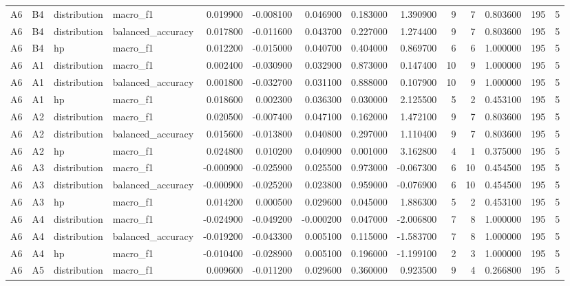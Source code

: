 \begin{table}
\begin{tabular}{llllrrrrrrrrrr}
A6 & B4 & distribution & macro\_f1 & 0.019900 & -0.008100 & 0.046900 & 0.183000 & 1.390900 & 9 & 7 & 0.803600 & 195 & 5 \\
A6 & B4 & distribution & balanced\_accuracy & 0.017800 & -0.011600 & 0.043700 & 0.227000 & 1.274400 & 9 & 7 & 0.803600 & 195 & 5 \\
A6 & B4 & hp & macro\_f1 & 0.012200 & -0.015000 & 0.040700 & 0.404000 & 0.869700 & 6 & 6 & 1.000000 & 195 & 5 \\
A6 & A1 & distribution & macro\_f1 & 0.002400 & -0.030900 & 0.032900 & 0.873000 & 0.147400 & 10 & 9 & 1.000000 & 195 & 5 \\
A6 & A1 & distribution & balanced\_accuracy & 0.001800 & -0.032700 & 0.031100 & 0.888000 & 0.107900 & 10 & 9 & 1.000000 & 195 & 5 \\
A6 & A1 & hp & macro\_f1 & 0.018600 & 0.002300 & 0.036300 & 0.030000 & 2.125500 & 5 & 2 & 0.453100 & 195 & 5 \\
A6 & A2 & distribution & macro\_f1 & 0.020500 & -0.007400 & 0.047100 & 0.162000 & 1.472100 & 9 & 7 & 0.803600 & 195 & 5 \\
A6 & A2 & distribution & balanced\_accuracy & 0.015600 & -0.013800 & 0.040800 & 0.297000 & 1.110400 & 9 & 7 & 0.803600 & 195 & 5 \\
A6 & A2 & hp & macro\_f1 & 0.024800 & 0.010200 & 0.040900 & 0.001000 & 3.162800 & 4 & 1 & 0.375000 & 195 & 5 \\
A6 & A3 & distribution & macro\_f1 & -0.000900 & -0.025900 & 0.025500 & 0.973000 & -0.067300 & 6 & 10 & 0.454500 & 195 & 5 \\
A6 & A3 & distribution & balanced\_accuracy & -0.000900 & -0.025200 & 0.023800 & 0.959000 & -0.076900 & 6 & 10 & 0.454500 & 195 & 5 \\
A6 & A3 & hp & macro\_f1 & 0.014200 & 0.000500 & 0.029600 & 0.045000 & 1.886300 & 5 & 2 & 0.453100 & 195 & 5 \\
A6 & A4 & distribution & macro\_f1 & -0.024900 & -0.049200 & -0.000200 & 0.047000 & -2.006800 & 7 & 8 & 1.000000 & 195 & 5 \\
A6 & A4 & distribution & balanced\_accuracy & -0.019200 & -0.043300 & 0.005100 & 0.115000 & -1.583700 & 7 & 8 & 1.000000 & 195 & 5 \\
A6 & A4 & hp & macro\_f1 & -0.010400 & -0.028900 & 0.005100 & 0.196000 & -1.199100 & 2 & 3 & 1.000000 & 195 & 5 \\
A6 & A5 & distribution & macro\_f1 & 0.009600 & -0.011200 & 0.029600 & 0.360000 & 0.923500 & 9 & 4 & 0.266800 & 195 & 5 \\

\end{tabular}
\end{table}

